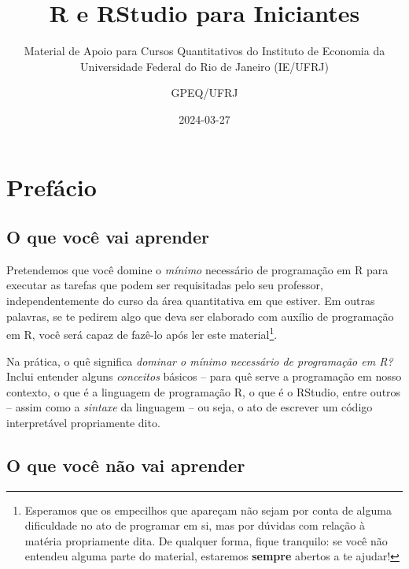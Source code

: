 \documentclass[
  letterpaper,
  DIV=11,
  numbers=noendperiod]{scrreprt}
\title{R e RStudio para Iniciantes}
\subtitle{Material de Apoio para Cursos Quantitativos do Instituto de
Economia da Universidade Federal do Rio de Janeiro (IE/UFRJ)}
\author{GPEQ/UFRJ}
\date{2024-03-27}
\renewcommand*\contentsname{Índice}
\newcommand\contentsname{Índice}
\begin{document}
\maketitle

\renewcommand*\contentsname{Índice}
{
\hypersetup{linkcolor=}
\setcounter{tocdepth}{2}
\tableofcontents
}

\chapter*{Prefácio}\label{sec-preface}


\section*{O que você vai aprender}\label{o-que-vocuxea-vai-aprender}


Pretendemos que você domine o \emph{mínimo} necessário de programação em
R para executar as tarefas que podem ser requisitadas pelo seu
professor, independentemente do curso da área quantitativa em que
estiver. Em outras palavras, se te pedirem algo que deva ser elaborado
com auxílio de programação em R, você será capaz de fazê-lo após ler
este material\footnote{Esperamos que os empecilhos que apareçam não
  sejam por conta de alguma dificuldade no ato de programar em si, mas
  por dúvidas com relação à matéria propriamente dita. De qualquer
  forma, fique tranquilo: se você não entendeu alguma parte do material,
  estaremos \textbf{sempre} abertos a te ajudar!}.

Na prática, o quê significa \emph{dominar o mínimo necessário de
programação em R?} Inclui entender alguns \emph{conceitos} básicos --
para quê serve a programação em nosso contexto, o que é a linguagem de
programação R, o que é o RStudio, entre outros -- assim como a
\emph{sintaxe} da linguagem -- ou seja, o ato de escrever um código
interpretável propriamente dito.

\section*{\texorpdfstring{O que você \textbf{não} vai
aprender}{O que você não vai aprender}}\label{o-que-vocuxea-nuxe3o-vai-aprender}
\end{document}
